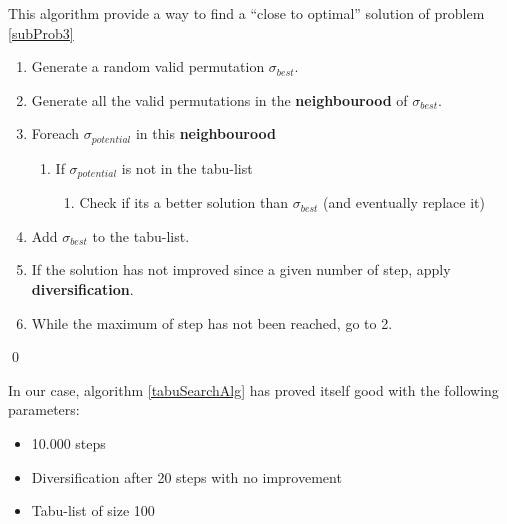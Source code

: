 \begin{algorithm}
  This algorithm provide a way to find a ``close to optimal'' solution of problem \ref{subProb3} 
  \begin{enumerate}
   \item Generate a random valid permutation $\sigma_{best}$.
   \item Generate all the valid permutations in the \textbf{neighbourood} of $\sigma_{best}$.
   \item Foreach $\sigma_{potential}$ in this \textbf{neighbourood}
   \begin{enumerate}
    \item If $\sigma_{potential}$ is not in the tabu-list
    \begin{enumerate}
     \item Check if its a better solution than $\sigma_{best}$ (and eventually replace it)
     \end{enumerate}
   \end{enumerate}
     \item Add $\sigma_{best}$ to the tabu-list.
     \item If the solution has not improved since a given number of step, apply \textbf{diversification}.
   \item While the maximum of step has not been reached, go to 2. 
  \end{enumerate}
   \qed
 \label{tabuSearchAlg}
\end{algorithm}

In our case, algorithm \ref{tabuSearchAlg} has proved itself good with the following parameters:
\begin{itemize}
 \item 10.000 steps
 \item Diversification after 20 steps with no improvement
 \item Tabu-list of size 100
\end{itemize}




